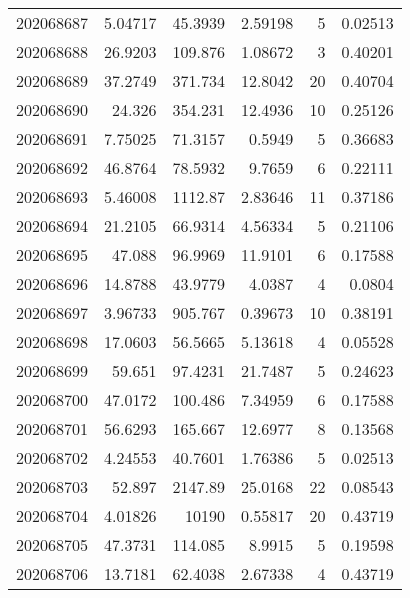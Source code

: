 \begin{tabular}{rrrrrr}
 202068687 &          5.04717 &       45.3939 &            2.59198 &           5 & 0.02513 \\
 202068688 &         26.9203  &      109.876  &            1.08672 &           3 & 0.40201 \\
 202068689 &         37.2749  &      371.734  &           12.8042  &          20 & 0.40704 \\
 202068690 &         24.326   &      354.231  &           12.4936  &          10 & 0.25126 \\
 202068691 &          7.75025 &       71.3157 &            0.5949  &           5 & 0.36683 \\
 202068692 &         46.8764  &       78.5932 &            9.7659  &           6 & 0.22111 \\
 202068693 &          5.46008 &     1112.87   &            2.83646 &          11 & 0.37186 \\
 202068694 &         21.2105  &       66.9314 &            4.56334 &           5 & 0.21106 \\
 202068695 &         47.088   &       96.9969 &           11.9101  &           6 & 0.17588 \\
 202068696 &         14.8788  &       43.9779 &            4.0387  &           4 & 0.0804  \\
 202068697 &          3.96733 &      905.767  &            0.39673 &          10 & 0.38191 \\
 202068698 &         17.0603  &       56.5665 &            5.13618 &           4 & 0.05528 \\
 202068699 &         59.651   &       97.4231 &           21.7487  &           5 & 0.24623 \\
 202068700 &         47.0172  &      100.486  &            7.34959 &           6 & 0.17588 \\
 202068701 &         56.6293  &      165.667  &           12.6977  &           8 & 0.13568 \\
 202068702 &          4.24553 &       40.7601 &            1.76386 &           5 & 0.02513 \\
 202068703 &         52.897   &     2147.89   &           25.0168  &          22 & 0.08543 \\
 202068704 &          4.01826 &    10190      &            0.55817 &          20 & 0.43719 \\
 202068705 &         47.3731  &      114.085  &            8.9915  &           5 & 0.19598 \\
 202068706 &         13.7181  &       62.4038 &            2.67338 &           4 & 0.43719 \\

\end{tabular}
